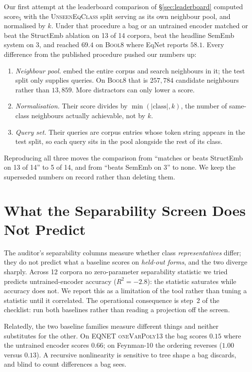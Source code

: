 Our first attempt at the leaderboard comparison of \S\ref{sec:leaderboard} computed
$\mathrm{score}_5$ with the \textsc{UnseenEqClass} split serving as its own neighbour pool, and
normalised by $k$. Under that procedure a bag or an untrained encoder matched or beat the StructEmb
ablation on 13 of 14 corpora, beat the headline SemEmb system on 3, and reached $69.4$ on
\textsc{Bool8} where EqNet reports $58.1$. Every difference from the published procedure pushed our
numbers up:

\begin{enumerate}[noitemsep,topsep=2pt,leftmargin=1.4em]
  \item \emph{Neighbour pool.} \citet{allamanis2017learning} embed the entire corpus and search
    neighbours in it; the test split only supplies queries. On \textsc{Bool8} that is $257{,}784$
    candidate neighbours rather than $13{,}859$. More distractors can only lower a score.
  \item \emph{Normalisation.} Their score divides by $\min(|\text{class}|, k)$, the number of
    same-class neighbours actually achievable, not by $k$.
  \item \emph{Query set.} Their queries are corpus entries whose token string appears in the test
    split, so each query sits in the pool alongside the rest of its class.
\end{enumerate}

Reproducing all three moves the comparison from ``matches or beats StructEmb on 13 of 14'' to 5 of
14, and from ``beats SemEmb on 3'' to none. We keep the superseded numbers on record rather than
deleting them.

\section{What the Separability Screen Does Not Predict}
\label{app:screen}

The auditor's separability columns measure whether class \emph{representatives} differ; they do not
predict what a baseline scores on \emph{held-out forms}, and the two diverge sharply. Across 12
corpora no zero-parameter separability statistic we tried predicts untrained-encoder accuracy
($R^2 = -2.8$): the statistic saturates while accuracy does not. We report this as a limitation of
the tool rather than tuning a statistic until it correlated. The operational consequence is step~2
of the checklist: run both baselines rather than reading a projection off the screen.

Relatedly, the two baseline families measure different things and neither substitutes for the
other. On EQNET \textsc{oneVarPoly13} the bag scores $0.15$ where the untrained encoder scores
$0.66$; on Feynman-10 the ordering reverses ($1.00$ versus $0.13$). A recursive nonlinearity is
sensitive to tree shape a bag discards, and blind to count differences a bag sees.

